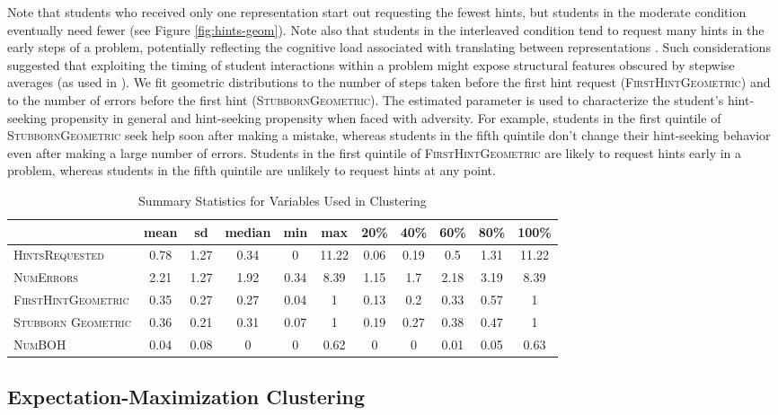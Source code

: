 \documentclass{edm_template}
\newcommand{\ftr}[1]{\textsc{#1}}
\begin{document}
Note that students who received only one representation start out requesting the fewest hints, but students in the moderate condition eventually need fewer  (see Figure \ref{fig:hints-geom}). Note also that students in the interleaved condition tend to request many hints in the early steps of a problem, potentially reflecting the cognitive load associated with translating between representations \cite{Ainsworth1999}. Such considerations suggested that exploiting the timing of student interactions within a problem might expose structural features obscured by stepwise averages (as used in \cite{Rau2012}).  We fit geometric distributions to the number of steps taken before the first hint request (\ftr{FirstHintGeometric}) and to the number of errors before the first hint (\ftr{StubbornGeometric}). The estimated parameter is used to characterize the student's hint-seeking propensity in general and hint-seeking propensity when faced with adversity. For example, students in the first quintile of \ftr{StubbornGeometric} seek help soon after making a mistake, whereas students in the fifth quintile don't change their hint-seeking behavior even after making a large number of errors. Students in the first quintile of \ftr{FirstHintGeometric} are likely to request hints early in a problem, whereas students in the fifth quintile are unlikely to request hints at any point.
\begin{table}[htbp]
\caption{Summary Statistics for Variables Used in Clustering}
\begin{center}
\begin{tabular}{| l || c | c || c | c | c || c | c | c | c | c |}
\hline
&mean& sd&median&min&max&20\%&40\%&60\%&	80\%&100\%\\ \hline \hline
\ftr{HintsRequested}&0.78&1.27&0.34&0&11.22&0.06&0.19&0.5&1.31&11.22\\ \hline
\ftr{NumErrors}&2.21&1.27&1.92&0.34&8.39&1.15&1.7&2.18&3.19&8.39\\ \hline 
\ftr{FirstHintGeometric}&0.35&0.27&0.27&0.04&1&0.13&0.2&0.33&0.57&1\\ \hline
\ftr{Stubborn Geometric}&0.36&0.21&0.31&0.07&1&0.19&0.27&0.38&0.47&1\\ \hline
\ftr{NumBOH}&0.04&0.08&0&0&0.62&0&0&0.01&0.05&0.63\\ \hline
 \end{tabular}
\end{center}
\label{tab:sumstats}
\end{table}

\subsection{Expectation-Maximization Clustering}
\label{sec:EM-clust}
\end{document}
